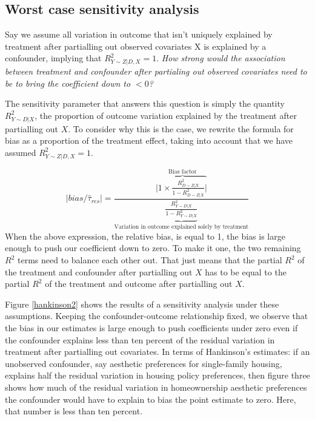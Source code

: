 \documentclass[hidelinks,11pt]{article}
\begin{document}
\subsection{Worst case sensitivity analysis}

Say we assume all variation in outcome that isn't uniquely explained by treatment after partialling out observed covariates X is explained by a confounder, implying that $R^2_{Y\sim Z|D,X}=1$. \emph{How strong would the association between treatment and confounder after partialing out observed covariates need to be to bring the coefficient down to $<0$?}

The sensitivity parameter that answers this question is simply the quantity $R^2_{Y\sim D|X}$, the proportion of outcome variation explained by the treatment after partialling out $X$. To consider why this is the case, we rewrite the formula for bias as a proportion of the treatment effect, taking into account that we have assumed $R^2_{Y\sim Z|D,X}=1$.

$$|bias/\hat \tau_{res}|= \frac{|\overbrace{1 \times \frac{R^2_{D \sim Z|X}}{1-R^2_{D \sim Z|X}}|}^{\text{Bias factor}} }{\underbrace{\frac{R^2_{Y \sim D|X}}{1 - R^2_{Y \sim D|X}}}_{\text{Variation in outcome explained solely by treatment}}}$$
When the above expression, the relative bias, is equal to 1, the bias is large enough to push our coefficient down to zero. To make it one, the two remaining $R^2$ terms need to balance each other out. That just means that the partial $R^2$ of the treatment and confounder after partialling out $X$ has to be equal to the partial $R^2$ of the treatment and outcome after partialling out $X$.

Figure \ref{hankinson2} shows the results of a sensitivity analysis under these assumptions. Keeping the confounder-outcome relationship fixed, we observe that the bias in our estimates is large enough to push coefficients under zero even if the confounder explains less than ten percent of the residual variation in treatment after partialling out covariates. In terms of Hankinson's estimates: if an unobserved confounder, say aesthetic preferences for single-family housing, explains half the residual variation in housing policy preferences, then figure three shows how much of the residual variation in homeownership aesthetic preferences the confounder would have to explain to bias the point estimate to zero. Here, that number is less than ten percent.
\end{document}
